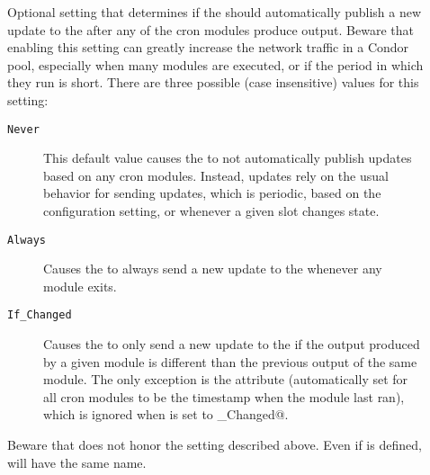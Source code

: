 \begin{description}
\item[]
\label{param:StartdCronAutopublish}
   Optional setting that determines if the  should
   automatically publish a new update to the  after
   any of the cron modules produce output.
   Beware that enabling this setting can greatly increase the network
   traffic in a Condor pool, especially when many modules are
   executed, or if the period in which they run is short.
   There are three possible (case insensitive) values for this
   setting: 
   \begin{description}
     \item[\texttt{Never}] This default value causes the
      to not automatically publish updates based on
     any cron modules. Instead, updates rely on the usual behavior for sending
     updates, which is periodic, based on the 
     configuration setting, or whenever a given slot
     changes state.
     \item[\texttt{Always}] Causes the  to always send a new
     update to the  whenever any module exits.
     \item[\texttt{If\_Changed}] Causes the  to only send a
     new update to the  if the output produced by a
     given module is different than the previous output of the
     same module.
     The only exception is the  attribute
     (automatically set for all cron modules to be the timestamp when
     the module last ran), which is ignored when
      is set to \verb@If_Changed@.
   \end{description}
   Beware that  does not honor the
    setting described above.
   Even if  is defined,
    will have the same name.

\end{description}

